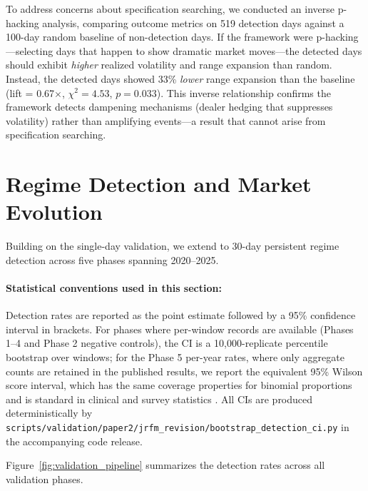 \documentclass[jrfm,article,accept,moreauthors,pdftex]{Definitions/mdpi}
\begin{document}
To address concerns about specification searching, we conducted an inverse p-hacking analysis, comparing outcome metrics on 519 detection days against a 100-day random baseline of non-detection days. If the framework were p-hacking---selecting days that happen to show dramatic market moves---the detected days should exhibit \textit{higher} realized volatility and range expansion than random. Instead, the detected days showed 33\% \textit{lower} range expansion than the baseline (lift = 0.67$\times$, $\chi^2 = 4.53$, $p = 0.033$). This inverse relationship confirms the framework detects dampening mechanisms (dealer hedging that suppresses volatility) rather than amplifying events---a result that cannot arise from specification searching.



\section{Regime Detection and Market Evolution}
\label{sec:regime}

Building on the single-day validation, we extend to 30-day persistent regime detection across five phases spanning 2020--2025.

\paragraph{{Statistical conventions used in this section:}} %
Detection rates are reported as the point estimate followed by a 95\%
confidence interval in brackets. For phases where per-window records
are available (Phases 1--4 and Phase 2 negative controls), the CI is
a 10{,}000-replicate percentile bootstrap over windows; for the Phase 5
per-year rates, where only aggregate counts are retained in the published
results, we report the equivalent 95\% Wilson score interval, which has
the same coverage properties for binomial proportions and is standard in
clinical and survey statistics \citep{brown2001interval}. All CIs are
produced deterministically by
\texttt{scripts/validation/paper2/jrfm\_revision/bootstrap\_detection\_ci.py}
in the accompanying code release.

Figure~\ref{fig:validation_pipeline} summarizes the detection rates across all validation phases.
\end{document}
